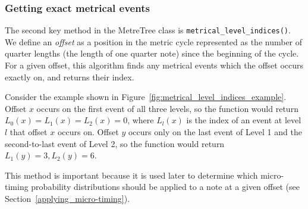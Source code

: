 \documentclass[12pt,twoside,openright]{report}
\begin{document}
\subsubsection{Getting exact metrical events} \label{metrical_level_indices}

The second key method in the MetreTree class is \verb'metrical_level_indices()'. We define an \emph{offset} as a position in the metric cycle represented as the number of quarter lengths (the length of one quarter note) since the beginning of the cycle. For a
given offset, this algorithm finds any metrical events
which the offset occurs exactly on, and returns their index.

Consider the example shown in Figure~\ref{fig:metrical_level_indices_example}. Offset $x$
occurs on the first event of all three levels, so the function would return $L_0(x)=L_1(x)=L_2(x)=0$, where $L_l(x)$ is the index of an event at level $l$ that offset $x$ occurs on. Offset $y$ occurs only on the last event of Level 1 and the second-to-last event of Level 2, so the function would return $L_1(y)=3, L_2(y)=6$.

This method is important because it
is used later to determine which micro-timing probability distributions should
be applied to a note at a given offset (see Section~\ref{applying_micro-timing}).
\end{document}
